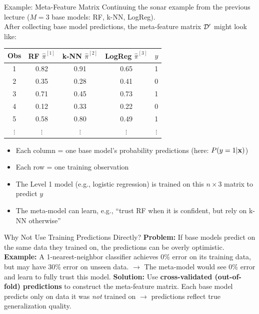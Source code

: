 \documentclass[11pt,compress,t,notes=noshow, xcolor=table]{beamer}
\begin{document}

\begin{vbframe}{Example: Meta-Feature Matrix}
\footnotesize
Continuing the sonar example from the previous lecture ($M = 3$ base models: RF, k-NN, LogReg).\\
After collecting base model predictions, the meta-feature matrix $\mathcal{D}^\prime$ might look like:

\vspace{0.5em}
\begin{table}[h]
\centering
\begin{tabular}{c|ccc|c}
\textbf{Obs} & \textbf{RF} $\hat{\pi}^{[1]}$ & \textbf{k-NN} $\hat{\pi}^{[2]}$ & \textbf{LogReg} $\hat{\pi}^{[3]}$ & $y$ \\
\hline
1  & 0.82 & 0.91 & 0.65 & 1 \\
2  & 0.35 & 0.28 & 0.41 & 0 \\
3  & 0.71 & 0.45 & 0.73 & 1 \\
4  & 0.12 & 0.33 & 0.22 & 0 \\
5  & 0.58 & 0.80 & 0.49 & 1 \\
$\vdots$ & $\vdots$ & $\vdots$ & $\vdots$ & $\vdots$ \\
\end{tabular}
\end{table}

\vspace{0.3em}
\begin{itemize}
    \item Each column = one base model's probability predictions (here: $P(y=1 | \mathbf{x})$)
    \item Each row = one training observation
    \item The Level 1 model (e.g., logistic regression) is trained on this $n \times 3$ matrix to predict $y$
    \item The meta-model can learn, e.g., ``trust RF when it is confident, but rely on k-NN otherwise''
\end{itemize}

\end{vbframe}


\begin{vbframe}{Why Not Use Training Predictions Directly?}
\vfill
\textbf{Problem:} If base models predict on the same data they trained on, the predictions can be overly optimistic.
\vfill
\textbf{Example:} A 1-nearest-neighbor classifier achieves 0\% error on its training data, but may have 30\% error on unseen data.
$\rightarrow$ The meta-model would see 0\% error and learn to fully trust this model.
\vfill
\textbf{Solution:} Use \textbf{cross-validated (out-of-fold) predictions} to construct the meta-feature matrix.
Each base model predicts only on data it was \emph{not} trained on $\rightarrow$ predictions reflect true generalization quality.
\vfill

\end{vbframe}
\end{document}
